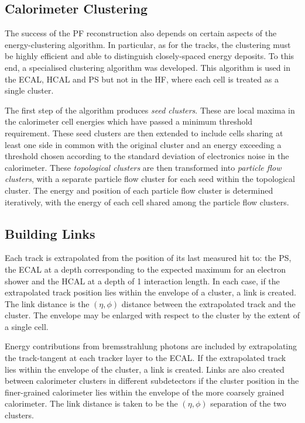 \subsection{Calorimeter Clustering}
The success of the \ac{PF} reconstruction also depends on certain aspects of the
energy-clustering algorithm. In particular, as for the tracks, the clustering
must be highly efficient and able to distinguish closely-spaced energy deposits.
To this end, a specialised clustering algorithm was developed. This algorithm is
used in the \ac{ECAL}, \ac{HCAL} and \ac{PS} but not in the \ac{HF}, where each
cell is treated as a single cluster.

The first step of the algorithm produces \emph{seed clusters}. These are local
maxima in the calorimeter cell energies which have passed a minimum threshold
requirement.  These seed clusters are then extended to include cells sharing at
least one side in common with the original cluster and an energy exceeding a
threshold chosen according to the standard deviation of electronics noise in the
calorimeter. These \emph{topological clusters} are then transformed into
\emph{particle flow clusters}, with a separate particle flow cluster for each
seed within the topological cluster. The energy and position of each particle
flow cluster is determined iteratively, with the energy of each cell shared
among the particle flow clusters.

\subsection{Building Links}
Each track is extrapolated from the position of its last measured hit to: the
\ac{PS}, the \ac{ECAL} at a depth corresponding to the expected maximum for an
electron shower and the \ac{HCAL} at a depth of 1 interaction length. In each
case, if the extrapolated track position lies within the envelope of a cluster,
a link is created. The link distance is the $(\eta, \phi)$ distance between the
extrapolated track and the cluster. The envelope may be enlarged with respect to
the cluster by the extent of a single cell.

Energy contributions from bremsstrahlung photons are included by extrapolating
the track-tangent at each tracker layer to the \ac{ECAL}. If the extrapolated
track lies within the envelope of the cluster, a link is created.  Links are
also created between calorimeter clusters in different subdetectors if the
cluster position in the finer-grained calorimeter lies within the envelope of
the more coarsely grained calorimeter. The link distance is taken to be the
$(\eta, \phi)$ separation of the two clusters.

